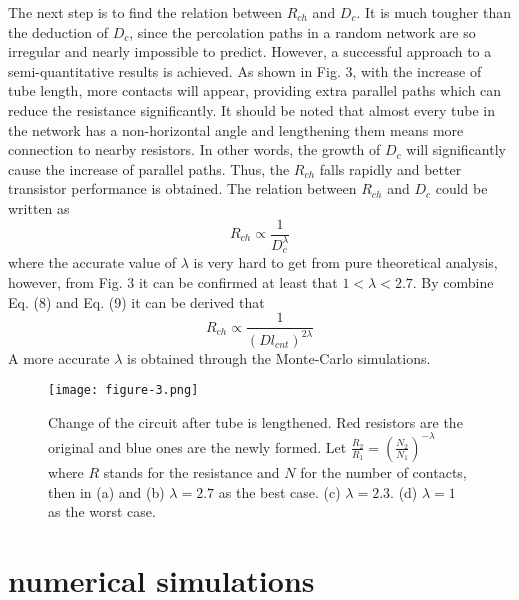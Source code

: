 \documentclass[letterpaper, 10 pt, conference]{ieeeconf}
\begin{document}
The next step is to find the relation between $R_{ch}$ and $D_c$. It is much tougher than the deduction of $D_c$, since the percolation paths in a random network are so irregular and nearly impossible to predict. However, a successful approach to a semi-quantitative results is achieved. As shown in Fig. 3, with the increase of tube length, more contacts will appear, providing extra parallel paths which can reduce the resistance significantly. It should be noted that almost every tube in the network has a non-horizontal angle and lengthening them means more connection to nearby resistors. In other words, the growth of $D_c$ will significantly cause the increase of parallel paths. Thus, the $R_{ch}$ falls rapidly and better transistor performance is obtained. The relation between $R_{ch}$ and $D_c$ could be written as
\begin{equation}
  R_{ch}\propto\frac{1}{D_c^{\lambda}}
\end{equation}
where the accurate value of $\lambda$ is very hard to get from pure theoretical analysis, however, from Fig. 3 it can be confirmed at least that $1<\lambda<2.7$. By combine Eq. (8) and Eq. (9) it can be derived that
\begin{equation}
  R_{ch}\propto\frac{1}{(Dl_{cnt})^{2\lambda}}
\end{equation}
A more accurate $\lambda$ is obtained through the Monte-Carlo simulations.

\begin{figure}[!h]
  \centering
  \texttt{[image: figure-3.png]}
  \caption{
    Change of the circuit after tube is lengthened. Red resistors are the original and blue ones are the newly formed. Let $\frac{R_2}{R_1}=(\frac{N_2}{N_1})^{-\lambda}$ where $R$ stands for the resistance and $N$ for the number of contacts, then in (a) and (b) $\lambda=2.7$ as the best case. (c) $\lambda=2.3$. (d) $\lambda=1$ as the worst case.
  }
\end{figure}

\section{numerical simulations}
\end{document}
